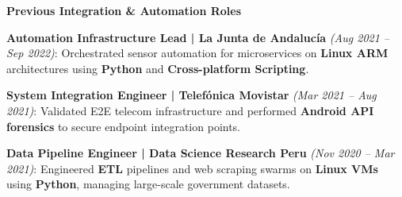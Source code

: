 \item \label{job:older}
\textbf{Previous Integration \& Automation Roles}
\resumeItemListStart
    \item \textbf{Automation Infrastructure Lead | La Junta de Andalucía} \textit{(Aug 2021 – Sep 2022)}: Orchestrated sensor automation for microservices on \textbf{Linux ARM} architectures using \textbf{Python} and \textbf{Cross-platform Scripting}.
    \item \textbf{System Integration Engineer | Telefónica Movistar} \textit{(Mar 2021 – Aug 2021)}: Validated E2E telecom infrastructure and performed \textbf{Android API forensics} to secure endpoint integration points.
    \item \textbf{Data Pipeline Engineer | Data Science Research Peru} \textit{(Nov 2020 – Mar 2021)}: Engineered \textbf{ETL} pipelines and web scraping swarms on \textbf{Linux VMs} using \textbf{Python}, managing large-scale government datasets.
\resumeItemListEnd